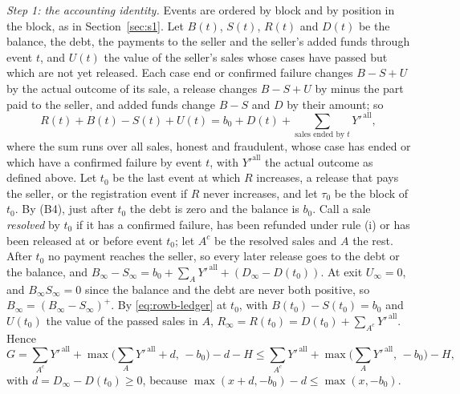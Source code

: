 \documentclass[10pt,a4paper]{article}
\theoremstyle{plain}
\theoremstyle{remark}
\begin{document}
\emph{Step 1: the accounting identity.} Events are ordered by block and by position in the block, as in Section~\ref{sec:s1}. Let $B(t)$, $S(t)$, $R(t)$ and $D(t)$ be the balance, the debt, the payments to the seller and the seller's added funds through event $t$, and $U(t)$ the value of the seller's sales whose cases have passed but which are not yet released. Each case end or confirmed failure changes $B-S+U$ by the actual outcome of its sale, a release changes $B-S+U$ by minus the part paid to the seller, and added funds change $B-S$ and $D$ by their amount; so
\begin{equation}\label{eq:rowb-ledger}
R(t)+B(t)-S(t)+U(t)=b_0+D(t)+\sum_{\text{sales ended by }t}Y'^{\,\mathrm{all}},
\end{equation}
where the sum runs over all sales, honest and fraudulent, whose case has ended or which have a confirmed failure by event $t$, with $Y'^{\mathrm{all}}$ the actual outcome as defined above. Let $t_0$ be the last event at which $R$ increases, a release that pays the seller, or the registration event if $R$ never increases, and let $\tau_0$ be the block of $t_0$. By (B4), just after $t_0$ the debt is zero and the balance is $b_0$. Call a sale \emph{resolved} by $t_0$ if it has a confirmed failure, has been refunded under rule (i) or has been released at or before event $t_0$; let $A^c$ be the resolved sales and $A$ the rest. After $t_0$ no payment reaches the seller, so every later release goes to the debt or the balance, and $B_\infty-S_\infty=b_0+\sum_{A}Y'^{\,\mathrm{all}}+(D_\infty-D(t_0))$. At exit $U_\infty=0$, and $B_\infty S_\infty=0$ since the balance and the debt are never both positive, so $B_\infty=(B_\infty-S_\infty)^+$. By \eqref{eq:rowb-ledger} at $t_0$, with $B(t_0)-S(t_0)=b_0$ and $U(t_0)$ the value of the passed sales in $A$, $R_\infty=R(t_0)=D(t_0)+\sum_{A^c}Y'^{\,\mathrm{all}}$. Hence
\[
G=\sum_{A^c}Y'^{\,\mathrm{all}}+\max\Big(\sum_{A}Y'^{\,\mathrm{all}}+d,\,-b_0\Big)-d-H
\le\sum_{A^c}Y'^{\,\mathrm{all}}+\max\Big(\sum_{A}Y'^{\,\mathrm{all}},\,-b_0\Big)-H,
\]
with $d=D_\infty-D(t_0)\ge0$, because $\max(x+d,-b_0)-d\le\max(x,-b_0)$.
\end{document}
